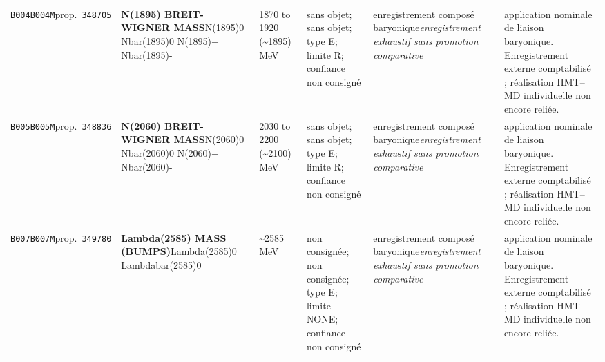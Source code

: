 \begin{landscape}
\begin{longtable}{L{1.85cm}L{4.45cm}L{2.35cm}L{4.05cm}L{3.35cm}L{7.15cm}}
\texttt{B004}\newline \texttt{B004M}\newline prop.\ \texttt{348705} & \textbf{N(1895) BREIT-WIGNER MASS}\newline N(1895)0 \textbar{}\allowbreak{} Nbar(1895)0 \textbar{}\allowbreak{} N(1895)+ \textbar{}\allowbreak{} Nbar(1895)- & 1870 to 1920 (\textasciitilde{}1895)\,MeV & sans objet; sans objet; type E; limite R; confiance non consigné & enregistrement composé baryonique\newline \emph{enregistrement exhaustif sans promotion comparative} & application nominale de liaison baryonique. Enregistrement externe comptabilisé ; réalisation HMT--MD individuelle non encore reliée. \\
\texttt{B005}\newline \texttt{B005M}\newline prop.\ \texttt{348836} & \textbf{N(2060) BREIT-WIGNER MASS}\newline N(2060)0 \textbar{}\allowbreak{} Nbar(2060)0 \textbar{}\allowbreak{} N(2060)+ \textbar{}\allowbreak{} Nbar(2060)- & 2030 to 2200 (\textasciitilde{}2100)\,MeV & sans objet; sans objet; type E; limite R; confiance non consigné & enregistrement composé baryonique\newline \emph{enregistrement exhaustif sans promotion comparative} & application nominale de liaison baryonique. Enregistrement externe comptabilisé ; réalisation HMT--MD individuelle non encore reliée. \\
\texttt{B007}\newline \texttt{B007M}\newline prop.\ \texttt{349780} & \textbf{Lambda(2585) MASS (BUMPS)}\newline Lambda(2585)0 \textbar{}\allowbreak{} Lambdabar(2585)0 & \textasciitilde{}2585\,MeV & non consignée; non consignée; type E; limite NONE; confiance non consigné & enregistrement composé baryonique\newline \emph{enregistrement exhaustif sans promotion comparative} & application nominale de liaison baryonique. Enregistrement externe comptabilisé ; réalisation HMT--MD individuelle non encore reliée. \\

\end{longtable}
\end{landscape}

